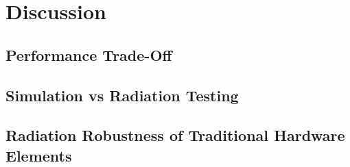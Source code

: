 \section{Discussion}\label{sec:discussion}

\subsection{Performance Trade-Off}\label{subsec:discussion_performance_trade_off}

\subsection{Simulation vs Radiation Testing}

\subsection{Radiation Robustness of Traditional Hardware Elements}

